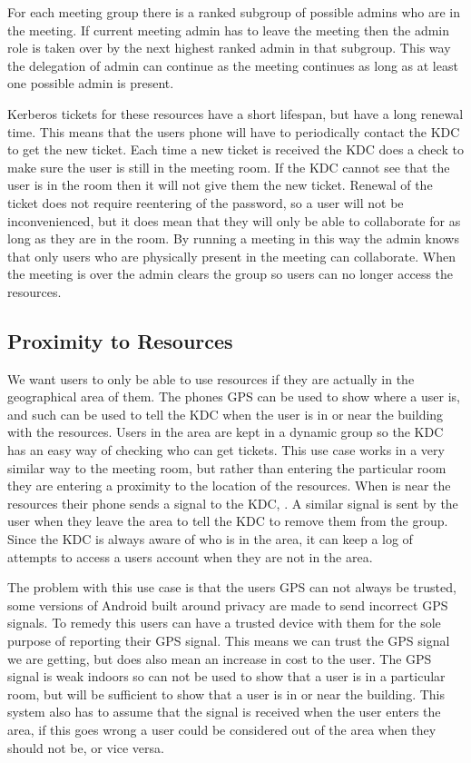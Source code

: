 \documentclass[]{report}   %
\begin{document}
For each meeting group there is a ranked subgroup of possible admins who are in the meeting. If current meeting admin has to leave the meeting then the admin role is taken over by the next highest ranked admin in that subgroup. This way the delegation of admin can continue as the meeting continues as long as at least one possible admin is present.

Kerberos tickets for these resources have a short lifespan, but have a long renewal time. This means that the users phone will have to periodically contact the KDC to get the new ticket. Each time a new ticket is received the KDC does a check to make sure the user is still in the meeting room. If the KDC cannot see that the user is in the room then it will not give them the new ticket. Renewal of the ticket does not require reentering of the password, so a user will not be inconvenienced, but it does mean that they will only be able to collaborate for as long as they are in the room. By running a meeting in this way the admin knows that only users who are physically present in the meeting can collaborate. When the meeting is over the admin clears the group so users can no longer access the resources.


\subsection{Proximity to Resources}
We want users to only be able to use resources if they are actually in the geographical area of them. The phones GPS can be used to show where a user is, and such can be used to tell the KDC when the user is in or near the building with the resources. Users in the area are kept in a dynamic group so the KDC has an easy way of checking who can get tickets. This use case works in a very similar way to the meeting room, but rather than entering the particular room they are entering a proximity to the location of the resources. When is near the resources their phone sends a signal to the KDC, . A similar signal is sent by the user when they leave the area to tell the KDC to remove them from the group. Since the KDC is always aware of who is in the area, it can keep a log of attempts to access a users account when they are not in the area.

The problem with this use case is that the users GPS can not always be trusted, some versions of Android built around privacy are made to send incorrect GPS signals. To remedy this users can have a trusted device with them for the sole purpose of reporting their GPS signal. This means we can trust the GPS signal we are getting, but does also mean an increase in cost to the user. The GPS signal is weak indoors so can not be used to show that a user is in a particular room, but will be sufficient to show that a user is in or near the building. This system also has to assume that the signal is received when the user enters the area, if this goes wrong a user could be considered out of the area when they should not be, or vice versa.
\end{document}
